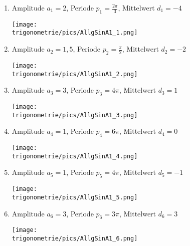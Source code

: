 \documentclass[a4paper,12pt, headsepline, ngerman]{scrartcl}
\theoremstyle{definition}
\begin{document}
\begin{Answer}[ref=allgSinCosA1]
\begin{enumerate}[label=\alph*)]
	\item Amplitude \(a_{1}=2\), Periode \(p_{1}=\frac{2\pi}{3}\), Mittelwert \(d_{1}=-4\)\\
	 \begin{minipage}{\textwidth}
	 \texttt{[image: \\trigonometrie/pics/AllgSinA1\_1.png]}\\
	 \end{minipage}	 
	 \item Amplitude \(a_{2}=1,5\), Periode \(p_{2}=\frac{\pi}{2}\), Mittelwert \(d_{2}=-2\)\\
	 \begin{minipage}{\textwidth}
	 \texttt{[image: \\trigonometrie/pics/AllgSinA1\_2.png]}\\
	 \end{minipage}	 
	 \item Amplitude \(a_{3}=3\), Periode \(p_{3}=4\pi\), Mittelwert \(d_{3}=1\)\\
	 \begin{minipage}{\textwidth}
	 \texttt{[image: \\trigonometrie/pics/AllgSinA1\_3.png]}\\
	 \end{minipage}	 
	 \item Amplitude \(a_{4}=1\), Periode \(p_{4}=6\pi\), Mittelwert \(d_{4}=0\)\\
	 \begin{minipage}{\textwidth}
	 \texttt{[image: \\trigonometrie/pics/AllgSinA1\_4.png]}\\
	 \end{minipage}	 
	 \item Amplitude \(a_{5}=1\), Periode \(p_{5}=4\pi\), Mittelwert \(d_{5}=-1\)\\
	 \begin{minipage}{\textwidth}
	 \texttt{[image: \\trigonometrie/pics/AllgSinA1\_5.png]}\\
	 \end{minipage}	 
	 \item Amplitude \(a_{6}=3\), Periode \(p_{6}=3\pi\), Mittelwert \(d_{6}=3\)\\
	 \begin{minipage}{\textwidth}
	 \texttt{[image: \\trigonometrie/pics/AllgSinA1\_6.png]}\\
	 \end{minipage}	 

\end{enumerate}
\end{Answer}
\end{document}
